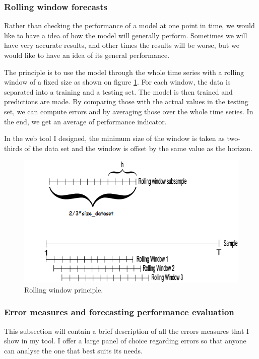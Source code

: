 \documentclass[11pt,a4paper,oneside]{book}
\begin{document}
\subsubsection{Rolling window forecasts}


Rather than checking the performance of a model at one point in time, we would like to have a idea of how the model will generally perform. Sometimes we will have very accurate results, and other times the results will be worse, but we would like to have an idea of its general performance.

The principle is to use the model through the whole time series with a rolling window of a fixed size as shown on figure \ref{fig:rolling}. For each window, the data is separated into a training and a testing set. The model is then trained and predictions are made. By comparing those with the actual values in the testing set, we can compute errors and by averaging those over the whole time series. In the end, we get an average of performance indicator.

In the web tool I designed, the minimum size of the window is taken as two-thirds of the data set and the window is offset by the same value as the horizon.


\begin{figure}[!h]
  \centering
    \includegraphics[scale=0.7]{img/rollingwindow.png}
  \caption{Rolling window principle\cite{rolling}.}
  \label{fig:rolling}
\end{figure}


\subsubsection{Error measures and forecasting performance evaluation}\label{errors}

This subsection will contain a brief description of all the errors measures that I show in my tool. I offer a large panel of choice regarding errors so that anyone can analyse the one that best suits its needs. 
\end{document}
